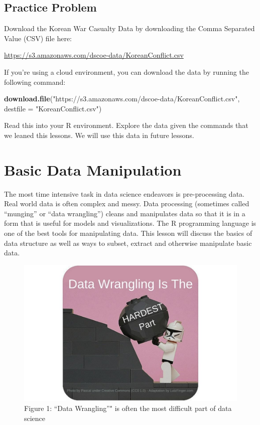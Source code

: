 \documentclass[]{book}
\newenvironment{Shaded}{\begin{snugshade}}{\end{snugshade}}
\newcommand{\KeywordTok}[1]{\textcolor[rgb]{0.13,0.29,0.53}{\textbf{{#1}}}}
\newcommand{\DataTypeTok}[1]{\textcolor[rgb]{0.13,0.29,0.53}{{#1}}}
\newcommand{\StringTok}[1]{\textcolor[rgb]{0.31,0.60,0.02}{{#1}}}
\newcommand{\NormalTok}[1]{{#1}}
\begin{document}
\section{Practice Problem}\label{practice-problem}

Download the Korean War Casualty Data by downloading the Comma Separated
Value (CSV) file here:

\url{https://s3.amazonaws.com/dscoe-data/KoreanConflict.csv}

If you're using a cloud environment, you can download the data by
running the following command:

\begin{Shaded}
\begin{Highlighting}[]
\KeywordTok{download.file}\NormalTok{(}\StringTok{"https://s3.amazonaws.com/dscoe-data/KoreanConflict.csv"}\NormalTok{, }\DataTypeTok{destfile =} \StringTok{"KoreanConflict.csv"}\NormalTok{)}
\end{Highlighting}
\end{Shaded}

Read this into your R environment. Explore the data given the commands
that we leaned this lessons. We will use this data in future lessons.

\chapter{Basic Data Manipulation}\label{basic-data-manipulation}

The most time intensive task in data science endeavors is pre-processing
data. Real world data is often complex and messy. Data processing
(sometimes called ``munging'' or ``data wrangling'') cleans and
manipulates data so that it is in a form that is useful for models and
visualizations. The R programming language is one of the best tools for
manipulating data. This lesson will discuss the basics of data structure
as well as ways to subset, extract and otherwise manipulate basic data.

\begin{figure}[htbp]
\centering
\includegraphics{dataWrangling.jpg}
\caption{Figure 1: ``Data Wrangling''" is often the most difficult part
of data science}
\end{figure}
\end{document}
